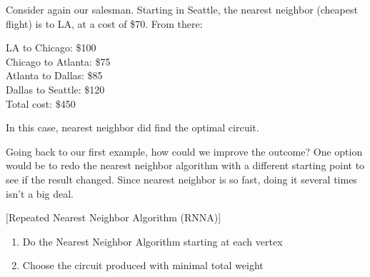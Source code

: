 \begin{example}{}{}%
Consider again our salesman.  Starting in Seattle, the nearest neighbor (cheapest flight) is to LA, at a cost of \$70.  From there:

\begin{minipage}{0.5\textwidth}
\noindent LA to Chicago:  \$100\\
Chicago to Atlanta: \$75\\
Atlanta to Dallas: \$85\\
Dallas to Seattle: \$120\\
Total cost: \$450\\
\end{minipage}
%
\begin{minipage}{0.5\textwidth}
\end{minipage}

\noindent In this case, nearest neighbor did find the optimal circuit.  
\end{example}


Going back to our first example, how could we improve the outcome?  One option would be to redo the nearest neighbor algorithm with a different starting point to see if the result changed.  Since nearest neighbor is so fast, doing it several times isn't a big deal.

\begin{algorithm}{}{}[Repeated Nearest Neighbor Algorithm (RNNA)]
\hspace{3in}
\begin{enumerate}
\item	Do the Nearest Neighbor Algorithm starting at each vertex
\item	Choose the circuit produced with minimal total weight
\end{enumerate}
\end{algorithm}

